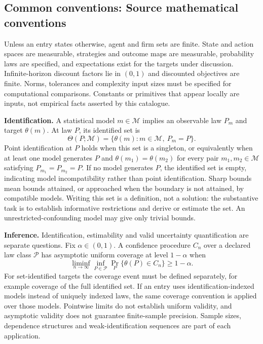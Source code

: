\documentclass[11pt,a4paper]{article}
\begin{document}
\subsection*{Common conventions: Source mathematical conventions}

Unless an entry states otherwise, agent and firm sets are finite. State and action spaces are measurable, strategies and outcome maps are measurable, probability laws are specified, and expectations exist for the targets under discussion. Infinite-horizon discount factors lie in $(0,1)$ and discounted objectives are finite. Norms, tolerances and complexity input sizes must be specified for computational comparisons. Constants or primitives that appear locally are inputs, not empirical facts asserted by this catalogue.

\textbf{Identification.} A statistical model $m\in\mathcal M$ implies an observable law $P_m$ and target $\theta(m)$. At law $P$, its identified set is
\[
\Theta(P;\mathcal M)=\{\theta(m):m\in\mathcal M,\ P_m=P\}.
\]
Point identification at $P$ holds when this set is a singleton, or equivalently when at least one model generates $P$ and $\theta(m_1)=\theta(m_2)$ for every pair $m_1,m_2\in\mathcal M$ satisfying $P_{m_1}=P_{m_2}=P$. If no model generates $P$, the identified set is empty, indicating model incompatibility rather than point identification. Sharp bounds mean bounds attained, or approached when the boundary is not attained, by compatible models. Writing this set is a definition, not a solution: the substantive task is to establish informative restrictions and derive or estimate the set. An unrestricted-confounding model may give only trivial bounds.

\textbf{Inference.} Identification, estimability and valid uncertainty quantification are separate questions. Fix $\alpha\in(0,1)$. A confidence procedure $C_n$ over a declared law class $\mathcal P$ has asymptotic uniform coverage at level $1-\alpha$ when
\[
\liminf_{n\to\infty}\inf_{P\in\mathcal P}\Pr_P\{\theta(P)\in C_n\}\geq1-\alpha.
\]
For set-identified targets the coverage event must be defined separately, for example coverage of the full identified set. If an entry uses identification-indexed models instead of uniquely indexed laws, the same coverage convention is applied over those models. Pointwise limits do not establish uniform validity, and asymptotic validity does not guarantee finite-sample precision. Sample sizes, dependence structures and weak-identification sequences are part of each application.
\end{document}
